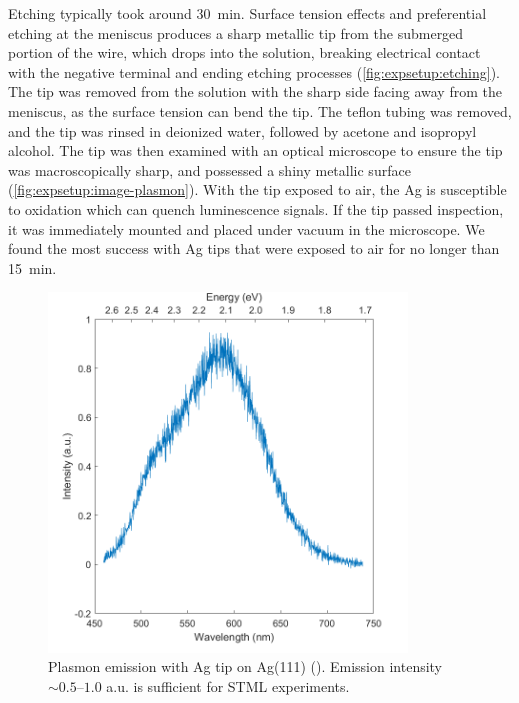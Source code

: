 Etching typically took around \SI{30}{min}. Surface tension effects and preferential etching at the meniscus produces a sharp metallic tip from the submerged portion of the wire, which drops into the solution, breaking electrical contact with the negative terminal and ending etching processes (\autoref{fig:expsetup:etching}). The tip was removed from the solution with the sharp side facing away from the meniscus, as the surface tension can bend the tip. The teflon tubing was removed, and the tip was rinsed in deionized water, followed by acetone and isopropyl alcohol. The tip was then examined with an optical microscope to ensure the tip was macroscopically sharp, and possessed a shiny metallic surface (\autoref{fig:expsetup:image-plasmon}). With the tip exposed to air, the Ag is susceptible to oxidation which can quench luminescence signals. If the tip passed inspection, it was immediately mounted and placed under vacuum in the microscope. We found the most success with Ag tips that were exposed to air for no longer than \SI{15}{min}.

\begin{figure}[H]
    \centering
    
    \includegraphics[width=0.85\textwidth]{pictures/ag111_plasmon.png}
    \caption[Plasmon emission with Ag tip on Ag(111) (). Emission intensity $\sim 0.5$--$1.0$ a.u. is sufficient for STML experiments.]{Plasmon emission with Ag tip on Ag(111) (). Emission intensity $\sim 0.5$--$1.0$ a.u. is sufficient for STML experiments.\footnotemark}
    
    \label{fig:expsetup:plasmon}
\end{figure}

